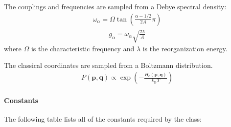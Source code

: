 \documentclass[letterpaper,10pt,english]{sphinxmanual}
\begin{document}
\sphinxAtStartPar
The couplings and frequencies are sampled from a Debye spectral density:
\begin{equation*}
\begin{split}\omega_{\alpha} = \Omega\tan\left(\frac{\alpha - 1/2}{2A}\pi\right)\end{split}
\end{equation*}\begin{equation*}
\begin{split}g_{\alpha} = \omega_{\alpha}\sqrt{\frac{2\lambda}{A}}\end{split}
\end{equation*}
\sphinxAtStartPar
where \(\Omega\) is the characteristic frequency and \(\lambda\) is the reorganization energy.

\sphinxAtStartPar
The classical coordinates are sampled from a Boltzmann distribution.
\begin{equation*}
\begin{split}P(\boldsymbol{p},\boldsymbol{q}) \propto \exp\left(-\frac{H_{\mathrm{c}}(\boldsymbol{p},\boldsymbol{q})}{k_{\mathrm{B}}T}\right)\end{split}
\end{equation*}

\paragraph{Constants}
\label{\detokenize{user_guide/models/spin_boson_model:constants}}
\sphinxAtStartPar
The following table lists all of the constants required by the  class:
\end{document}
